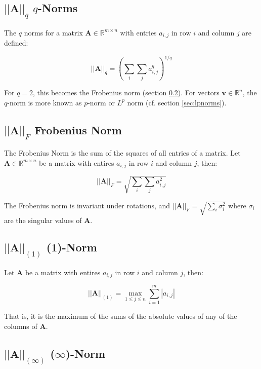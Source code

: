 \subsection{$||\mathbf{A}||_q$ $q$-Norms}
\label{sec:qnorms}

The $q$ norms for a matrix $\mathbf{A} \in \mathbb{R}^{m\times n}$ with entries $a_{i,j}$ in row $i$ and column $j$ are defined:

\begin{equation}
||\mathbf{A}||_q = \left(\sum_{i}\sum_{j} a^q_{i,j}\right)^{1/q}
\end{equation}

For $q=2$, this becomes the Frobenius norm (section \ref{sec:frobenius}). For vectors $\mathbf{v}\in\mathbb{R}^{n}$, the $q$-norm is more known as $p$-norm or $L^p$ norm (cf. section \ref{sec:lpnorms}). 


\subsection{$||\mathbf{A}||_F$ Frobenius Norm}
\label{sec:frobenius}
The Frobenius Norm is the sum of the squares of all entries of a matrix. Let $\mathbf{A} \in \mathbb{R}^{m\times n}$ be a matrix with entires $a_{i,j}$ in row $i$ and column $j$, then:

\begin{equation}
||\mathbf{A}||_F = \sqrt{\sum_{i}\sum_{j} a^2_{i,j}}
\end{equation}

The Frobenius norm is invariant under rotations, and $||\mathbf{A}||_F = \sqrt{\sum_i \sigma_i^2}$ where $\sigma_i$ are the singular values of $\mathbf{A}$. 

\subsection{$||\mathbf{A}||_{(1)}$ (1)-Norm}
Let $\mathbf{A}$ be a matrix with entires $a_{i,j}$ in row $i$ and column $j$, then:

\begin{equation}
||\mathbf{A}||_{(1)} = \max_{1\leq j \leq n} \sum^m_{i=1} |a_{i,j} |
\end{equation}

That is, it is the maximum of the sums of the absolute values of any of the columns of $\mathbf{A}$.

\subsection{$||\mathbf{A}||_{(\infty)}$ ($\infty$)-Norm}

